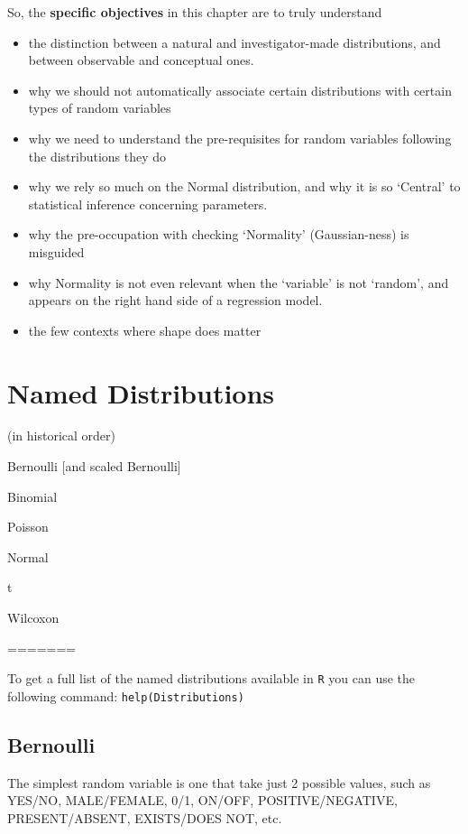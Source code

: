 \documentclass[]{book}
\begin{document}
So, the \textbf{specific objectives} in this chapter are to truly understand

\begin{itemize}
\item
  the distinction between a natural and investigator-made distributions, and between observable and conceptual ones.
\item
  why we should not automatically associate certain distributions with certain types of random variables
\item
  why we need to understand the pre-requisites for random variables following the distributions they do
\item
  why we rely so much on the Normal distribution, and why it is so `Central' to statistical inference concerning parameters.
\item
  why the pre-occupation with checking `Normality' (Gaussian-ness) is misguided
\item
  why Normality is not even relevant when the `variable' is not `random', and appears on the right hand side of a regression model.
\item
  the few contexts where shape does matter
\end{itemize}

\hypertarget{named-distributions}{%
\section{Named Distributions}\label{named-distributions}}

(in historical order)

Bernoulli {[}and scaled Bernoulli{]}

Binomial

Poisson

Normal

t

Wilcoxon

=======

To get a full list of the named distributions available in \texttt{R} you can use the following command: \texttt{help(Distributions)}

\hypertarget{bernoulli}{%
\subsection{Bernoulli}\label{bernoulli}}

The simplest random variable is one that take just 2 possible values, such as YES/NO, MALE/FEMALE, 0/1, ON/OFF, POSITIVE/NEGATIVE, PRESENT/ABSENT, EXISTS/DOES NOT, etc.
\end{document}
